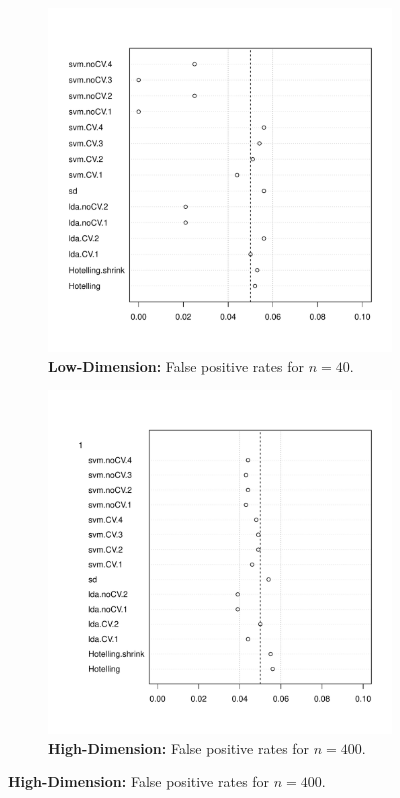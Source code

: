 \documentclass[12pt,a4paper]{article}
\theoremstyle{definition}
\newcommand{\mycaption}{Simulation details in Appendix~\ref{apx:simulation_details} except the changes in the sub-captions.}
\begin{document}
\begin{figure}[h]
\centering
\caption{\mycaption}	
\label{fig:large_sample}
	\begin{subfigure}{.5\textwidth}
	  \centering
	  \includegraphics[width=1\linewidth]{"art/2016-07-27 11:42:05zoom"}
	  \caption{\textbf{Low-Dimension:} False positive rates for $n=40$.} 
	\label{fig:large_sample_1}
	\end{subfigure}%
	\begin{subfigure}{.5\textwidth}
	  \centering
	  \includegraphics[width=1\linewidth]{"art/2016-08-04 13:59:33zoom"}
	  \caption{\textbf{High-Dimension:} False positive rates for $n=400$.} 
	\label{fig:large_sample_2}
	\end{subfigure}
\end{figure}
\end{document}
